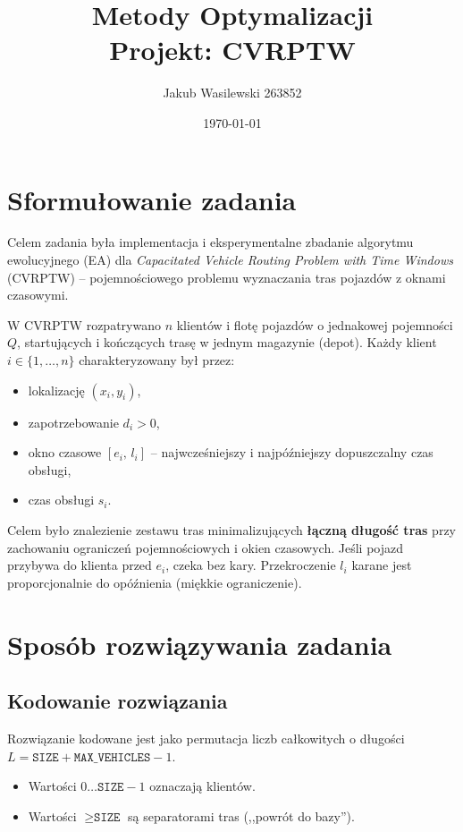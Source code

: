 \documentclass[11pt,a4paper]{article}
\title{Metody Optymalizacji\\Projekt: CVRPTW}
\author{Jakub Wasilewski 263852}
\date{\today}
\begin{document}
\maketitle
\tableofcontents
\clearpage

\section{Sformułowanie zadania}

Celem zadania była implementacja i eksperymentalne zbadanie algorytmu ewolucyjnego (EA)
dla \textit{Capacitated Vehicle Routing Problem with Time Windows} (CVRPTW) --
pojemnościowego problemu wyznaczania tras pojazdów z oknami czasowymi.

W CVRPTW rozpatrywano $n$ klientów i flotę pojazdów o jednakowej pojemności $Q$,
startujących i kończących trasę w jednym magazynie (depot).
Każdy klient $i \in \{1,\ldots,n\}$ charakteryzowany był przez:
\begin{itemize}
    \item lokalizację $(x_i, y_i)$,
    \item zapotrzebowanie $d_i > 0$,
    \item okno czasowe $[e_i,\, l_i]$ -- najwcześniejszy i najpóźniejszy dopuszczalny czas obsługi,
    \item czas obsługi $s_i$.
\end{itemize}

Celem było znalezienie zestawu tras minimalizujących \textbf{łączną długość tras}
przy zachowaniu ograniczeń pojemnościowych i okien czasowych.
Jeśli pojazd przybywa do klienta przed $e_i$, czeka bez kary.
Przekroczenie $l_i$ karane jest proporcjonalnie do opóźnienia (miękkie ograniczenie).

\section{Sposób rozwiązywania zadania}

\subsection{Kodowanie rozwiązania}

Rozwiązanie kodowane jest jako permutacja liczb całkowitych o długości
$L = \texttt{SIZE} + \texttt{MAX\_VEHICLES} - 1$.
\begin{itemize}
    \item Wartości $0 \ldots \texttt{SIZE}-1$ oznaczają klientów.
    \item Wartości $\geq \texttt{SIZE}$ są separatorami tras (,,powrót do bazy'').
\end{itemize}
\end{document}
